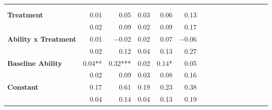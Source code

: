 \begin{tabular}{@{\extracolsep{5pt}}lrrrrrrrrrrrrrrr}
\toprule
&  &  &  &  &  \\
{\bf } &  &  &  &  &  \\
\hline
{\bf Treatment} & 0.01\phantom{\phantom{)}***} & 0.05\phantom{\phantom{)}***} & 0.03\phantom{\phantom{)}***} & 0.06\phantom{\phantom{)}***} & 0.13\phantom{\phantom{)}***} \\
{\bf } & 0.02\phantom{\phantom{)}***} & 0.09\phantom{\phantom{)}***} & 0.02\phantom{\phantom{)}***} & 0.09\phantom{\phantom{)}***} & 0.17\phantom{\phantom{)}***} \\
{\bf Ability x Treatment} & 0.01\phantom{\phantom{)}***} & $-$0.02\phantom{\phantom{)}***} & 0.02\phantom{\phantom{)}***} & 0.07\phantom{\phantom{)}***} & $-$0.06\phantom{\phantom{)}***} \\
{\bf } & 0.02\phantom{\phantom{)}***} & 0.12\phantom{\phantom{)}***} & 0.04\phantom{\phantom{)}***} & 0.13\phantom{\phantom{)}***} & 0.27\phantom{\phantom{)}***} \\
{\bf Baseline Ability} & 0.04\phantom{)}**\phantom{*} & 0.32\phantom{)}*** & 0.02\phantom{\phantom{)}***} & 0.14\phantom{)}*\phantom{**} & 0.05\phantom{\phantom{)}***} \\
{\bf } & 0.02\phantom{\phantom{)}***} & 0.09\phantom{\phantom{)}***} & 0.03\phantom{\phantom{)}***} & 0.08\phantom{\phantom{)}***} & 0.16\phantom{\phantom{)}***} \\
{\bf Constant} & 0.17\phantom{\phantom{)}***} & 0.61\phantom{\phantom{)}***} & 0.19\phantom{\phantom{)}***} & 0.23\phantom{\phantom{)}***} & 0.38\phantom{\phantom{)}***} \\
{\bf } & 0.04\phantom{\phantom{)}***} & 0.14\phantom{\phantom{)}***} & 0.04\phantom{\phantom{)}***} & 0.13\phantom{\phantom{)}***} & 0.19\phantom{\phantom{)}***} \\

\end{tabular}
